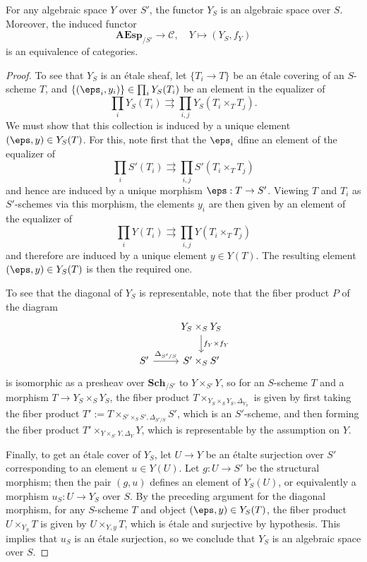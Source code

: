 \begin{proposition}\label{algebraic space base change equivalence of cat}
For any algebraic space $Y$ over $S'$, the functor $Y_S$ is an algebraic space over $S$. Moreover, the induced functor
\[\mathbf{AEsp}_{/S'}\to\mathcal{C},\quad Y\mapsto (Y_S,f_Y)\]
is an equivalence of categories.
\end{proposition}
\begin{proof}
To see that $Y_S$ is an \'etale sheaf, let $\{T_i\to T\}$ be an \'etale covering of an $S$-scheme $T$, and $\{(\eps_i,y_i)\}\in\prod_iY_S(T_i)$ be an element in the equalizer of
\[\prod_iY_S(T_i)\rightrightarrows \prod_{i,j}Y_S(T_i\times_TT_j).\]
We must show that this collection is induced by a unique element $(\eps,y)\in Y_S(T)$. For this, note first that the $\eps_i$ dfine an element of the equalizer of
\[\prod_iS'(T_i)\rightrightarrows \prod_{i,j}S'(T_i\times_TT_j)\]
and hence are induced by a unique morphism $\eps:T\to S'$. Viewing $T$ and $T_i$ as $S'$-schemes via this morphism, the elements $y_i$ are then given by an element of the equalizer of
\[\prod_iY(T_i)\rightrightarrows \prod_{i,j}Y(T_i\times_TT_j)\]
and therefore are induced by a unique element $y\in Y(T)$. The resulting element $(\eps,y)\in Y_S(T)$ is then the required one.\par
To see that the diagonal of $Y_S$ is representable, note that the fiber product $P$ of the diagram
\[\begin{tikzcd}
&Y_S\times_SY_S\ar[d,"f_Y\times f_Y"]\\
S'\ar[r,"\Delta_{S'/S}"]&S'\times_SS'
\end{tikzcd}\]
is isomorphic as a presheav over $\mathbf{Sch}_{/S'}$ to $Y\times_{S'}Y$, so for an $S$-scheme $T$ and a morphism $T\to Y_S\times_SY_S$, the fiber product $T\times_{Y_S\times_SY_S,\Delta_{Y_S}}$ is given by first taking the fiber product $T':=T\times_{S'\times_SS',\Delta_{S'/S}}S'$, which is an $S'$-scheme, and then forming the fiber product $T'\times_{Y\times_{S'}Y,\Delta_Y}Y$, which is representable by the assumption on $Y$.\par
Finally, to get an \'etale cover of $Y_S$, let $U\to Y$ be an \'etalte surjection over $S'$ corresponding to an element $u\in Y(U)$. Let $g:U\to S'$ be the structural morphism; then the pair $(g,u)$ defines an element of $Y_S(U)$, or equivalently a morphism $u_S:U\to Y_S$ over $S$. By the preceding argument for the diagonal morphism, for any $S$-scheme $T$ and object $(\eps,y)\in Y_S(T)$, the fiber product $U\times_{Y_S}T$ is given by $U\times_{Y,y}T$, which is \'etale and surjective by hypothesis. This implies that $u_S$ is an \'etale surjection, so we conclude that $Y_S$ is an algebraic space over $S$.\par

\end{proof}
